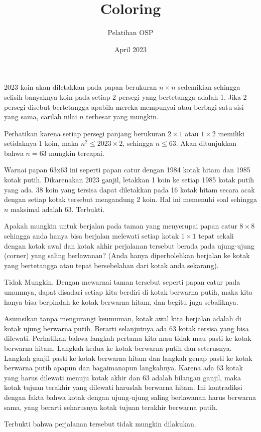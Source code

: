 \documentclass[12pt]{scrartcl}
\title{Coloring}
\author{Pelatihan OSP}
\date{April 2023}
\begin{document}
\maketitle

\renewcommand*\contentsname{Daftar Isi}
\tableofcontents

\newpage
\begin{soaljawab}
    2023 koin akan diletakkan pada papan berukuran $n \times n$ sedemikian sehingga selisih banyaknya koin pada setiap 2 persegi yang bertetangga adalah 1. Jika 2 persegi disebut bertetangga apabila mereka mempunyai atau berbagi satu sisi yang sama, carilah nilai $n$ terbesar yang mungkin.
    \begin{solusi}
        Perhatikan karena setiap persegi panjang berukuran $2 \times 1$ atau $1 \times 2$ memiliki setidaknya 1 koin, maka $n^2 \le 2023 \times 2$, sehingga $n \le 63$. Akan ditunjukkan bahwa $n=63$ mungkin tercapai.

        Warnai papan 63x63 ini seperti papan catur dengan 1984 kotak hitam dan 1985 kotak putih. Dikarenakan 2023 ganjil, letakkan 1 koin ke setiap 1985 kotak putih yang ada. 38 koin yang tersisa dapat diletakkan pada 16 kotak hitam secara acak dengan setiap kotak tersebut mengandung 2 koin. Hal ini memenuhi soal sehingga $n$ maksimal adalah 63. Terbukti.
    \end{solusi}
\end{soaljawab}

\begin{soaljawab}
    Apakah mungkin untuk berjalan pada taman yang menyerupai papan catur $8 \times 8$ sehingga anda hanya bisa berjalan melewati setiap kotak $1 \times 1$ tepat sekali dengan kotak awal dan kotak akhir perjalanan tersebut berada pada ujung-ujung (corner) yang saling berlawanan? (Anda hanya diperbolehkan berjalan ke kotak yang bertetangga atau tepat bersebelahan dari kotak anda sekarang).
    \begin{solusi}
        Tidak Mungkin. Dengan mewarnai taman tersebut seperti papan catur pada umumnya, dapat disadari setiap kita berdiri di kotak berwarna putih, maka kita hanya bisa berpindah ke kotak berwarna hitam, dan begitu juga sebaliknya. 
        
        Asumsikan tanpa mengurangi keumuman, kotak awal kita berjalan adalah di kotak ujung berwarna putih. Berarti selanjutnya ada 63 kotak tersisa yang bisa dilewati. Perhatikan bahwa langkah pertama kita mau tidak mau pasti ke kotak berwarna hitam. Langkah kedua ke kotak berwarna putih dan seterusnya. Langkah ganjil pasti ke kotak berwarna hitam dan langkah genap pasti ke kotak berwarna putih apapun dan bagaimanapun langkahnya. Karena ada 63 kotak yang harus dilewati menuju kotak akhir dan 63 adalah bilangan ganjil, maka kotak tujuan terakhir yang dilewati haruslah berwarna hitam. Ini kontradiksi dengan fakta bahwa kotak dengan ujung-ujung saling berlawanan harus berwarna sama, yang berarti seharusnya kotak tujuan terakhir berwarna putih.

        Terbukti bahwa perjalanan tersebut tidak mungkin dilakukan.
    \end{solusi}
\end{soaljawab}
\end{document}
